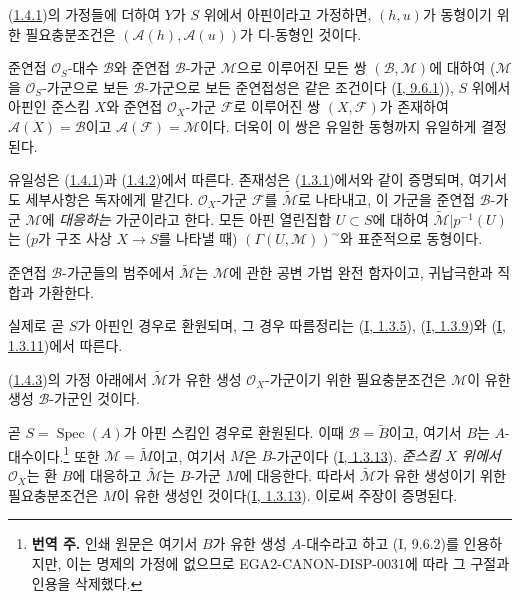\begin{env}[1.4.2]
\label{II.1.4.2-ko}
(\hyperref[II.1.4.1-ko]{1.4.1})의 가정들에 더하여 $Y$가 $S$ 위에서
아핀이라고 가정하면, $(h,u)$가 동형이기 위한 필요충분조건은
$(\mathcal{A}(h),\mathcal{A}(u))$가 디-동형인 것이다.
\end{env}

\begin{env}[1.4.3]
\label{II.1.4.3-ko}
준연접 $\mathcal{O}_S$-대수 $\mathcal{B}$와 준연접
$\mathcal{B}$-가군 $\mathcal{M}$으로 이루어진 모든 쌍
$(\mathcal{B},\mathcal{M})$에 대하여
($\mathcal{M}$을 $\mathcal{O}_S$-가군으로 보든
$\mathcal{B}$-가군으로 보든 준연접성은 같은 조건이다
(\hyperref[I.9.6.1-ko]{I, 9.6.1})), $S$ 위에서 아핀인 준스킴 $X$와
준연접 $\mathcal{O}_X$-가군 $\mathcal{F}$로 이루어진 쌍
$(X,\mathcal{F})$가 존재하여
$\mathcal{A}(X)=\mathcal{B}$이고
$\mathcal{A}(\mathcal{F})=\mathcal{M}$이다. 더욱이 이 쌍은 유일한
동형까지 유일하게 결정된다.
\end{env}

유일성은 (\hyperref[II.1.4.1-ko]{1.4.1})과
(\hyperref[II.1.4.2-ko]{1.4.2})에서 따른다. 존재성은
(\hyperref[II.1.3.1-ko]{1.3.1})에서와 같이 증명되며, 여기서도
세부사항은 독자에게 맡긴다. $\mathcal{O}_X$-가군 $\mathcal{F}$를
$\widetilde{\mathcal{M}}$로 나타내고, 이 가군을 준연접
$\mathcal{B}$-가군 $\mathcal{M}$에 \emph{대응하는} 가군이라고 한다.
모든 아핀 열린집합 $U\subset S$에 대하여
$\widetilde{\mathcal{M}}|p^{-1}(U)$는
($p$가 구조 사상 $X\to S$를 나타낼 때)
$(\Gamma(U,\mathcal{M}))^{\sim}$와 표준적으로 동형이다.

\begin{env}[1.4.4]
\label{II.1.4.4-ko}
준연접 $\mathcal{B}$-가군들의 범주에서
$\widetilde{\mathcal{M}}$는 $\mathcal{M}$에 관한 공변 가법 완전
함자이고, 귀납극한과 직합과 가환한다.
\end{env}

실제로 곧 $S$가 아핀인 경우로 환원되며, 그 경우 따름정리는
(\hyperref[I.1.3.5-ko]{I, 1.3.5}),
(\hyperref[I.1.3.9-ko]{I, 1.3.9})와
(\hyperref[I.1.3.11-ko]{I, 1.3.11})에서 따른다.

\begin{env}[1.4.5]
\label{II.1.4.5-ko}
(\hyperref[II.1.4.3-ko]{1.4.3})의 가정 아래에서
$\widetilde{\mathcal{M}}$가 유한 생성 $\mathcal{O}_X$-가군이기 위한
필요충분조건은 $\mathcal{M}$이 유한 생성 $\mathcal{B}$-가군인 것이다.
\end{env}

곧 $S=\operatorname{Spec}(A)$가 아핀 스킴인 경우로 환원된다. 이때
$\mathcal{B}=\widetilde{B}$이고, 여기서 $B$는 $A$-대수이다.\footnote{
\textbf{번역 주.} 인쇄 원문은 여기서 $B$가 유한 생성 $A$-대수라고
하고 (I, 9.6.2)를 인용하지만, 이는 명제의 가정에 없으므로
EGA2-CANON-DISP-0031에 따라 그 구절과 인용을 삭제했다.} 또한
$\mathcal{M}=\widetilde{M}$이고, 여기서 $M$은 $B$-가군이다
(\hyperref[I.1.3.13-ko]{I, 1.3.13}). \emph{준스킴 $X$ 위에서}
$\mathcal{O}_X$는 환 $B$에 대응하고
$\widetilde{\mathcal{M}}$는 $B$-가군 $M$에 대응한다. 따라서
$\widetilde{\mathcal{M}}$가 유한 생성이기 위한 필요충분조건은 $M$이
유한 생성인 것이다(\hyperref[I.1.3.13-ko]{I, 1.3.13}). 이로써
주장이 증명된다.

